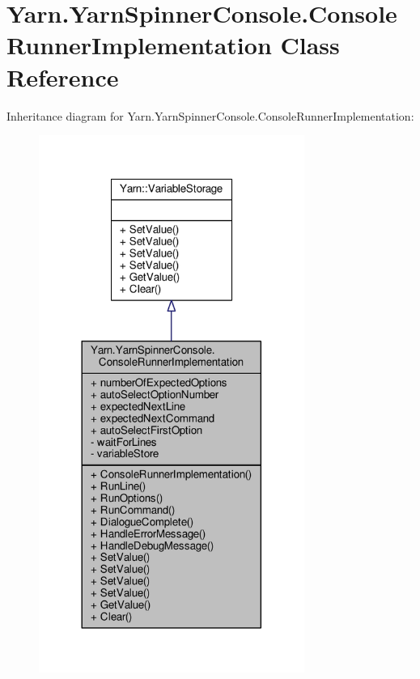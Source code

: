 \hypertarget{a00055}{\section{Yarn.\-Yarn\-Spinner\-Console.\-Console\-Runner\-Implementation Class Reference}
\label{a00055}
}


Inheritance diagram for Yarn.\-Yarn\-Spinner\-Console.\-Console\-Runner\-Implementation\-:
\nopagebreak
\begin{figure}[H]
\begin{center}
\leavevmode
\includegraphics[width=246pt]{a00671}
\end{center}
\end{figure}


